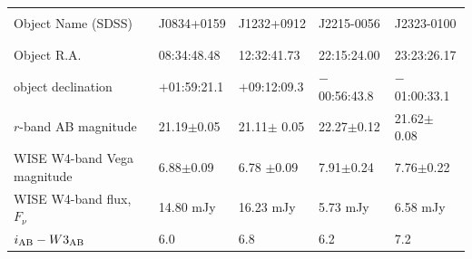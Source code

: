 \begin{table}
\begin{center}
\begin{tabular}{||  l|l|l|l|l ||}
  \hline\hline
  &&&& \\
  Object Name (SDSS)        & J0834+0159         &  J1232+0912          & J2215-0056        & J2323-0100 \\
  &&&& \\
  \hline
  &&&& \\
  Object R.A.                             & 08:34:48.48         & 12:32:41.73           & 22:15:24.00          & 23:23:26.17     \\
  object declination                  & $+$01:59:21.1     & $+$09:12:09.3      & $-$00:56:43.8      & $-$01:00:33.1  \\
  $r$-band AB magnitude         & 21.19$\pm$0.05  & 21.11$\pm$ 0.05  & 22.27$\pm$0.12  & 21.62$\pm$ 0.08 \\  
  WISE W4-band Vega magnitude & 6.88$\pm$0.09  & 6.78 $\pm$0.09   & 7.91$\pm$0.24  & 7.76$\pm$0.22 \\  
  WISE W4-band flux, $F_{\nu}$   & 14.80 mJy             & 16.23 mJy              & 5.73 mJy                 & 6.58 mJy  \\ 
  $i_{\rm AB}-W3_{\rm AB}$            & 6.0                        & 6.8                        & 6.2                        & 7.2\\


\end{tabular}
\end{center}
\end{table}
